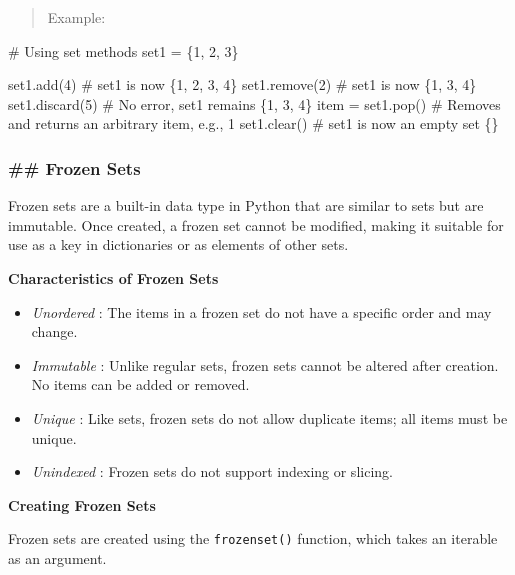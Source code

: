 \documentclass[
  letterpaper,
  DIV=11,
  numbers=noendperiod]{scrreprt}
\newenvironment{Shaded}{\begin{snugshade}}{\end{snugshade}}
\newcommand{\CommentTok}[1]{\textcolor[rgb]{0.37,0.37,0.37}{#1}}
\newcommand{\DecValTok}[1]{\textcolor[rgb]{0.68,0.00,0.00}{#1}}
\newcommand{\NormalTok}[1]{\textcolor[rgb]{0.00,0.23,0.31}{#1}}
\newcommand{\OperatorTok}[1]{\textcolor[rgb]{0.37,0.37,0.37}{#1}}
\providecommand{\tightlist}{%
  \setlength{\itemsep}{0pt}\setlength{\parskip}{0pt}}\usepackage{longtable,booktabs,array}
\theoremstyle{plain}
\theoremstyle{definition}
\theoremstyle{remark}
\begin{document}
\begin{quote}
Example:
\end{quote}

\begin{Shaded}
\begin{Highlighting}[]
\CommentTok{\# Using set methods}
\NormalTok{set1 }\OperatorTok{=}\NormalTok{ \{}\DecValTok{1}\NormalTok{, }\DecValTok{2}\NormalTok{, }\DecValTok{3}\NormalTok{\}}

\NormalTok{set1.add(}\DecValTok{4}\NormalTok{)        }\CommentTok{\# set1 is now \{1, 2, 3, 4\}}
\NormalTok{set1.remove(}\DecValTok{2}\NormalTok{)     }\CommentTok{\# set1 is now \{1, 3, 4\}}
\NormalTok{set1.discard(}\DecValTok{5}\NormalTok{)    }\CommentTok{\# No error, set1 remains \{1, 3, 4\}}
\NormalTok{item }\OperatorTok{=}\NormalTok{ set1.pop()  }\CommentTok{\# Removes and returns an arbitrary item, e.g., 1}
\NormalTok{set1.clear()      }\CommentTok{\# set1 is now an empty set \{\}}
\end{Highlighting}
\end{Shaded}

\subsubsection{\#\# Frozen Sets}\label{frozen-sets}

Frozen sets are a built-in data type in Python that are similar to sets
but are immutable. Once created, a frozen set cannot be modified, making
it suitable for use as a key in dictionaries or as elements of other
sets.

\textbf{Characteristics of Frozen Sets}

\begin{itemize}
\tightlist
\item
  \emph{Unordered} : The items in a frozen set do not have a specific
  order and may change.
\item
  \emph{Immutable} : Unlike regular sets, frozen sets cannot be altered
  after creation. No items can be added or removed.
\item
  \emph{Unique} : Like sets, frozen sets do not allow duplicate items;
  all items must be unique.
\item
  \emph{Unindexed} : Frozen sets do not support indexing or slicing.
\end{itemize}

\textbf{Creating Frozen Sets}

Frozen sets are created using the \texttt{frozenset()} function, which
takes an iterable as an argument.
\end{document}
